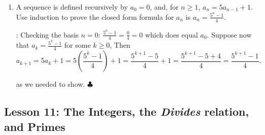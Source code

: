 \documentclass[11pt]{amsart}
\begin{document}
\begin{enumerate}
\item A sequence is defined recursively by $a_0=0$, and, for $n\geq 1$, $a_n = 5a_{n-1}+1$.
Use induction to prove the closed form formula for $a_n$ is $\displaystyle a_n = \frac{5^n-1}{4}$. 
\medskip

: Checking the basis $n=0$: $\displaystyle\frac{5^0-1}{4} = \frac{0}{4} = 0$
which does equal $a_0$.
Suppose now that $\displaystyle a_k = \frac{5^k-1}{4}$ for some $k\geq0$, Then
\[
a_{k+1} = 5a_k+1 = 5\left(\frac{5^k-1}{4}\right) + 1 = \frac{5^{k+1} - 5}{ 4} + 1
= \frac{5^{k+1} - 5 + 4}{4} = \frac{5^{k+1}-1}{4}.
\]

 as we needed to show. $\clubsuit$

\end{enumerate}

\subsection{Lesson 11: The Integers, the {\it Divides} relation, and Primes}
\end{document}
